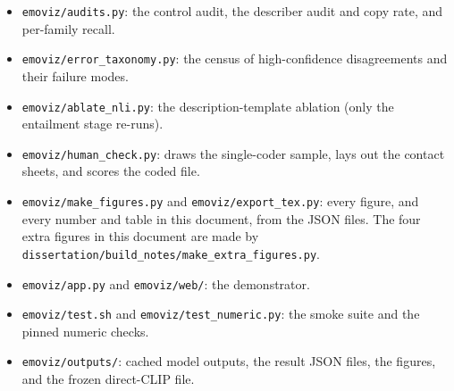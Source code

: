 \begin{sloppypar}
\begin{itemize}
\item \texttt{emoviz/audits.py}: the control audit, the describer audit and copy rate, and per-family recall.
\item \texttt{emoviz/error\_taxonomy.py}: the census of high-confidence disagreements and their failure modes.
\item \texttt{emoviz/ablate\_nli.py}: the description-template ablation (only the entailment stage re-runs).
\item \texttt{emoviz/human\_check.py}: draws the single-coder sample, lays out the contact sheets, and scores the coded file.
\item \texttt{emoviz/make\_figures.py} and \texttt{emoviz/export\_tex.py}: every figure, and every number and table in this document, from the JSON files. The four extra figures in this document are made by \texttt{dissertation/build\_notes/make\_extra\_figures.py}.
\item \texttt{emoviz/app.py} and \texttt{emoviz/web/}: the demonstrator.
\item \texttt{emoviz/test.sh} and \texttt{emoviz/test\_numeric.py}: the smoke suite and the pinned numeric checks.
\item \texttt{emoviz/outputs/}: cached model outputs, the result JSON files, the figures, and the frozen direct-CLIP file.
\end{itemize}


\end{sloppypar}
